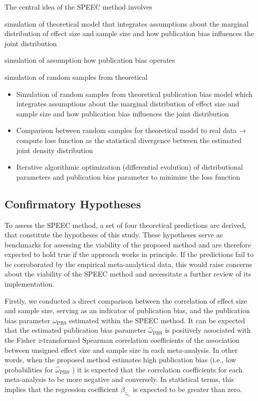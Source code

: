 \documentclass[
  12pt,
]{scrartcl}
\providecommand{\tightlist}{%
  \setlength{\itemsep}{0pt}\setlength{\parskip}{0pt}}\usepackage{longtable,booktabs,array}
\newcommand{\pbs}{\omega_{\text{PBS}}}
\newcommand{\epbs}{\widehat{\omega}_{\text{PBS}}}
\begin{document}
The central idea of the SPEEC method involves

simulation of theoretical model that integrates assumptions about the
marginal distribution of effect size and sample size and how publication
bias influences the joint distribution

simulation of assumption how publication bias operates

simulation of random samples from theoretical

\begin{itemize}
\tightlist
\item
  Simulation of random samples from theoretical publication bias model
  which integrates assumptions about the marginal distribution of effect
  size and sample size and how publication bias influences the joint
  distribution
\item
  Comparison between random samples for theoretical model to real data →
  compute loss function as the statistical divergence between the
  estimated joint density distribution
\item
  Iterative algorithmic optimization (differential evolution) of
  distributional parameters and publication bias parameter to minimize
  the loss function
\end{itemize}

\subsection{Confirmatory Hypotheses}\label{confirmatory-hypotheses}

To assess the SPEEC method, a set of four theoretical predictions are
derived, that constitute the hypotheses of this study. These hypotheses
serve as benchmarks for assessing the viability of the proposed method
and are therefore expected to hold true if the approach works in
principle. If the predictions fail to be corroborated by the empirical
meta-analytical data, this would raise concerns about the viability of
the SPEEC method and necessitate a further review of its implementation.

Firstly, we conducted a direct comparison between the correlation of
effect size and sample size, serving as an indicator of publication
bias, and the publication bias parameter \(\pbs\) estimated within the
SPEEC method. It can be expected that the estimated publication bias
parameter \(\epbs\) is positively associated with the Fisher
\emph{z}-transformed Spearman correlation coefficients of the
association between unsigned effect size and sample size in each
meta-analysis. In other words, when the proposed method estimates high
publication bias (i.e., low probabilities for \(\epbs\) ) it is expected
that the correlation coefficients for each meta-analysis to be more
negative and conversely. In statistical terms, this implies that the
regression coefficient \(\beta_{z_{r_s}}\) is expected to be greater
than zero.
\end{document}
